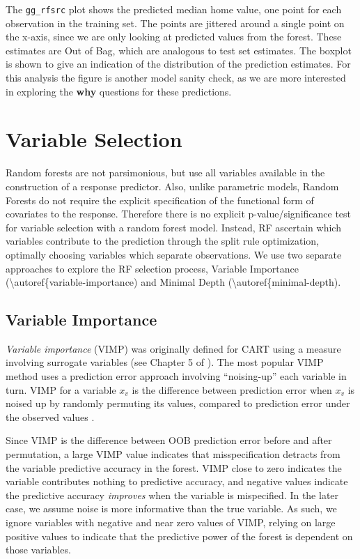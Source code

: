 \documentclass[article]{jss}
\begin{document}
The \texttt{gg\_rfsrc} plot shows the predicted median home value, one
point for each observation in the training set. The points are jittered
around a single point on the x-axis, since we are only looking at
predicted values from the forest. These estimates are Out of Bag, which
are analogous to test set estimates. The boxplot is shown to give an
indication of the distribution of the prediction estimates. For this
analysis the figure is another model sanity check, as we are more
interested in exploring the \textbf{why} questions for these
predictions.

\section{Variable Selection}\label{variable-selection}

Random forests are not parsimonious, but use all variables available in
the construction of a response predictor. Also, unlike parametric
models, Random Forests do not require the explicit specification of the
functional form of covariates to the response. Therefore there is no
explicit p-value/significance test for variable selection with a random
forest model. Instead, RF ascertain which variables contribute to the
prediction through the split rule optimization, optimally choosing
variables which separate observations. We use two separate approaches to
explore the RF selection process, Variable Importance
(\textbackslash{}autoref\{variable-importance) and Minimal Depth
(\textbackslash{}autoref\{minimal-depth).

\subsection{Variable Importance}\label{variable-importance}

\emph{Variable importance} (VIMP) was originally defined for CART using
a measure involving surrogate variables (see Chapter 5 of
\citep{cart:1984}). The most popular VIMP method uses a prediction error
approach involving ``noising-up'' each variable in turn. VIMP for a
variable \(x_v\) is the difference between prediction error when \(x_v\)
is noised up by randomly permuting its values, compared to prediction
error under the observed values \citep[\citet{Liaw:2002},
\citet{Ishwaran:2007}, \citet{Ishwaran:2008}]{Breiman:2001}.

Since VIMP is the difference between OOB prediction error before and
after permutation, a large VIMP value indicates that misspecification
detracts from the variable predictive accuracy in the forest. VIMP close
to zero indicates the variable contributes nothing to predictive
accuracy, and negative values indicate the predictive accuracy
\emph{improves} when the variable is mispecified. In the later case, we
assume noise is more informative than the true variable. As such, we
ignore variables with negative and near zero values of VIMP, relying on
large positive values to indicate that the predictive power of the
forest is dependent on those variables.
\end{document}
